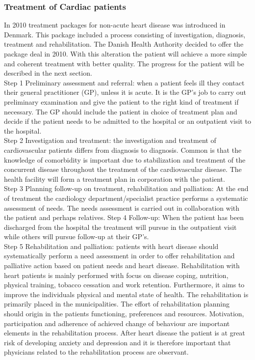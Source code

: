 \subsubsection{Treatment of Cardiac patients}

In 2010 treatment packages for non-acute heart disease was introduced in Denmark. This package included a process consisting of investigation, diagnosis, treatment and rehabilitation. The Danish Health Authority decided to offer the package deal in 2010. With this alteration the patient will achieve a more simple and coherent treatment with better quality. 
The progress for the patient will be described in the next section. \\

Step 1 Preliminary assessment and referral: when a patient feels ill they contact their general practitioner (GP), unless it is acute. It is the GP's job to carry out preliminary examination and give the patient to the right kind of treatment if necessary. The GP should include the patient in choice of treatment plan and decide if the patient needs to be admitted to the hospital or an outpatient visit to the hospital.\\
Step 2 Investigation and treatment: the investigation and treatment of cardiovascular patients differs from diagnosis to diagnosis. Common is that the knowledge of comorbidity is important due to stabilization and treatment of the concurrent disease throughout the treatment of the cardiovascular disease. The health facility will form a treatment plan in corporation with the patient. \\
Step 3 Planning follow-up on treatment, rehabilitation and palliation: At the end of treatment the cardiology department/specialist practice performs a systematic assessment of needs. The needs assessment is carried out in collaboration with the patient and perhaps relatives. 
Step 4 Follow-up: When the patient has been discharged from the hospital the treatment will pursue in the outpatient visit while others will pursue follow-up at their GP's. \\
Step 5 Rehabilitation and palliation: patients with heart disease should systematically perform a need assessment in order to offer rehabilitation and palliative action based on patient needs and heart disease. Rehabilitation with heart patients is mainly performed with focus on disease coping, nutrition, physical training, tobacco cessation and work retention. Furthermore, it aims to improve the individuals physical and mental state of health. The rehabilitation is primarily placed in the municipalities. The effort of rehabilitation planning should origin in the patients functioning, preferences and resources. Motivation, participation and adherence of achieved change of behaviour are important elements in the rehabilitation process. After heart disease the patient is at great risk of developing anxiety and depression and it is therefore important that physicians related to the rehabilitation process are observant. 
